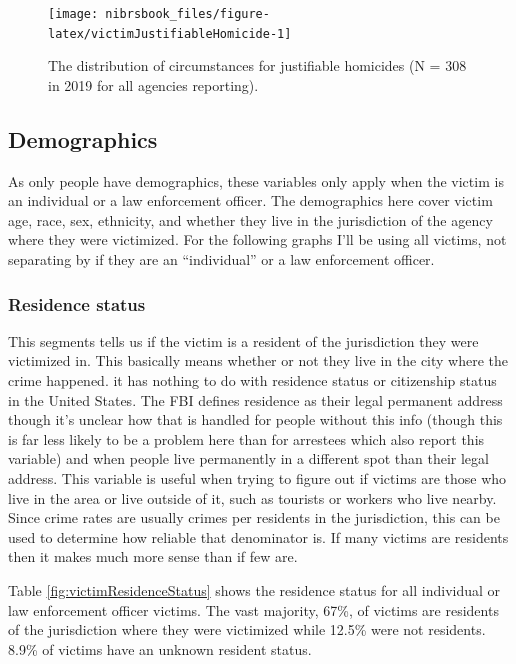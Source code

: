 \documentclass[
  12pt,
  openany]{book}
\begin{document}
\begin{figure}

{\centering \texttt{[image: nibrsbook\_files/figure-latex/victimJustifiableHomicide-1]} 

}

\caption{The distribution of circumstances for justifiable homicides (N = 308 in 2019 for all agencies reporting).}\label{fig:victimJustifiableHomicide}
\end{figure}

\hypertarget{demographics-1}{%
\subsection{Demographics}\label{demographics-1}}

As only people have demographics, these variables only apply when the victim is an individual or a law enforcement officer. The demographics here cover victim age, race, sex, ethnicity, and whether they live in the jurisdiction of the agency where they were victimized. For the following graphs I'll be using all victims, not separating by if they are an ``individual'' or a law enforcement officer.

\hypertarget{residence-status}{%
\subsubsection{Residence status}\label{residence-status}}

This segments tells us if the victim is a resident of the jurisdiction they were victimized in. This basically means whether or not they live in the city where the crime happened. it has nothing to do with residence status or citizenship status in the United States. The FBI defines residence as their legal permanent address though it's unclear how that is handled for people without this info (though this is far less likely to be a problem here than for arrestees which also report this variable) and when people live permanently in a different spot than their legal address. This variable is useful when trying to figure out if victims are those who live in the area or live outside of it, such as tourists or workers who live nearby. Since crime rates are usually crimes per residents in the jurisdiction, this can be used to determine how reliable that denominator is. If many victims are residents then it makes much more sense than if few are.

Table \ref{fig:victimResidenceStatus} shows the residence status for all individual or law enforcement officer victims. The vast majority, 67\%, of victims are residents of the jurisdiction where they were victimized while 12.5\% were not residents. 8.9\% of victims have an unknown resident status.
\end{document}
